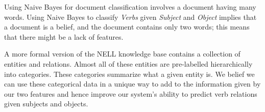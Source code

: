 Using Naive Bayes for document classification involves a document having many words. Using Naive Bayes to classify \emph{Verbs} given \emph{Subject} and \emph{Object} implies that a document is a belief, and the document contains only two words; this means that there might be a lack of features.

A more formal version of the NELL knowledge base contains a collection of entities and relations. Almost all of these entities are pre-labelled hierarchically into categories. These categories summarize what a given entity is. We belief we can use these categorical data in a unique way to add to the information given by our two features and hence improve our system's ability to predict verb relations given subjects and objects.